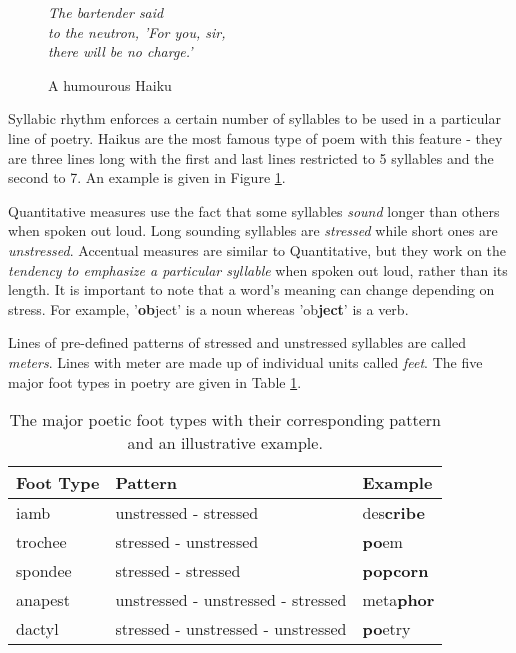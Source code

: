 \begin{figure}[h!]
\centering
\textit{
The bartender said\\
to the neutron, 'For you, sir,\\
there will be no charge.'\\
}
\caption{A humourous Haiku}
\label{fig:haiku}
\end{figure}

Syllabic rhythm enforces a certain number of syllables to be used in a particular line of poetry. Haikus are the most famous type of poem with this feature - they are three lines long with the first and last lines restricted to 5 syllables and the second to 7. An example is given in Figure \ref{fig:haiku}.

Quantitative measures use the fact that some syllables \textit{sound} longer than others when spoken out loud. Long sounding syllables are \textit{stressed} while short ones are \textit{unstressed}. Accentual measures are similar to Quantitative, but they work on the \textit{tendency to emphasize a particular syllable} when spoken out loud, rather than its length. It is important to note that a word's meaning can change depending on stress. For example, '\textbf{ob}ject' is a noun whereas 'ob\textbf{ject}' is a verb.

Lines of pre-defined patterns of stressed and unstressed syllables are called \textit{meters}. Lines with meter are made up of individual units called \textit{feet}. The five major foot types in poetry are given in Table \ref{tab:rhythm}.

\begin{table}[h!]
\centering
    \begin{tabular}{|l|l|l|}
    \hline
    Foot Type & Pattern                            & Example  \\ \hline
    iamb      & unstressed - stressed              & des\textbf{cribe} \\ \hline
    trochee   & stressed - unstressed              & \textbf{po}em     \\ \hline
    spondee   & stressed - stressed                & \textbf{popcorn}  \\ \hline
    anapest   & unstressed - unstressed - stressed & meta\textbf{phor} \\ \hline
    dactyl    & stressed - unstressed - unstressed & \textbf{po}etry   \\ \hline
    \end{tabular}
\caption{The major poetic foot types with their corresponding pattern and an illustrative example.}
\label{tab:rhythm}
\end{table}



